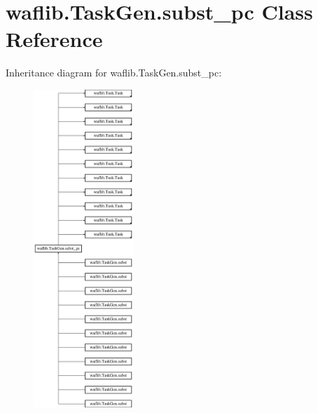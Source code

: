 \hypertarget{classwaflib_1_1_task_gen_1_1subst__pc}{}\section{waflib.\+Task\+Gen.\+subst\+\_\+pc Class Reference}
\label{classwaflib_1_1_task_gen_1_1subst__pc}
Inheritance diagram for waflib.\+Task\+Gen.\+subst\+\_\+pc\+:\begin{figure}[H]
\begin{center}
\leavevmode
\includegraphics[height=12.000000cm]{classwaflib_1_1_task_gen_1_1subst__pc}
\end{center}
\end{figure}
